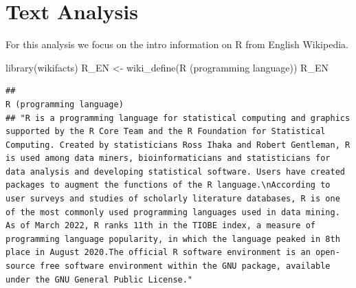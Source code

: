 \documentclass[
]{book}
\newenvironment{Shaded}{\begin{snugshade}}{\end{snugshade}}
\newcommand{\FunctionTok}[1]{\textcolor[rgb]{0.00,0.00,0.00}{#1}}
\newcommand{\NormalTok}[1]{#1}
\newcommand{\OtherTok}[1]{\textcolor[rgb]{0.56,0.35,0.01}{#1}}
\newcommand{\StringTok}[1]{\textcolor[rgb]{0.31,0.60,0.02}{#1}}
\begin{document}
\hypertarget{text-analysis}{%
\section{Text Analysis}\label{text-analysis}}

For this analysis we focus on the intro information on R from English Wikipedia.

\begin{Shaded}
\begin{Highlighting}[]
\FunctionTok{library}\NormalTok{(wikifacts)}
\NormalTok{R\_EN }\OtherTok{\textless{}{-}} \FunctionTok{wiki\_define}\NormalTok{(}\StringTok{\textquotesingle{}R (programming language)\textquotesingle{}}\NormalTok{)}
\NormalTok{R\_EN}
\end{Highlighting}
\end{Shaded}

\begin{verbatim}
##                                                                                                                                                                                                                                                                                                                                                                                                                                                                                                                                                                                                                                                                                                                                                                                                                                                              R (programming language) 
## "R is a programming language for statistical computing and graphics supported by the R Core Team and the R Foundation for Statistical Computing. Created by statisticians Ross Ihaka and Robert Gentleman, R is used among data miners, bioinformaticians and statisticians for data analysis and developing statistical software. Users have created packages to augment the functions of the R language.\nAccording to user surveys and studies of scholarly literature databases, R is one of the most commonly used programming languages used in data mining. As of March 2022, R ranks 11th in the TIOBE index, a measure of programming language popularity, in which the language peaked in 8th place in August 2020.The official R software environment is an open-source free software environment within the GNU package, available under the GNU General Public License."
\end{verbatim}
\end{document}
